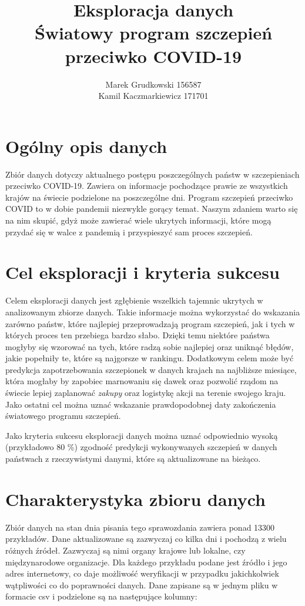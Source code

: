 \documentclass[12pt, oneside]{article}
\title{
	Eksploracja danych \\
	Światowy program szczepień przeciwko COVID-19
}
\author{
	Marek Grudkowski 156587
	\\
	Kamil Kaczmarkiewicz 171701
}
\begin{document}
\maketitle

\section{Ogólny opis danych}

Zbiór danych dotyczy aktualnego postępu poszczególnych państw w szczepieniach przeciwko COVID-19. Zawiera on informacje pochodzące prawie ze wszystkich krajów na świecie podzielone na poszczególne dni. Program szczepień przeciwko COVID to w dobie pandemii niezwykle gorący temat. Naszym zdaniem warto się na nim skupić, gdyż może zawierać wiele ukrytych informacji, które mogą przydać się w walce z pandemią i przyspieszyć sam proces szczepień. 

\section{Cel eksploracji i kryteria sukcesu}

Celem eksploracji danych jest zgłębienie wszelkich tajemnic ukrytych w analizowanym zbiorze danych. Takie informacje można wykorzystać do wskazania zarówno państw, które najlepiej przeprowadzają program szczepień, jak i tych w których proces ten przebiega bardzo słabo. Dzięki temu niektóre państwa mogłyby się wzorować na tych, które radzą sobie najlepiej oraz uniknąć błędów, jakie popełniły te, które są najgorsze w rankingu. Dodatkowym celem może być predykcja zapotrzebowania szczepionek w danych krajach na najbliższe miesiące, która mogłaby by zapobiec marnowaniu się dawek oraz pozwolić rządom na świecie lepiej zaplanować \textit{zakupy} oraz logistykę akcji na terenie swojego kraju.  Jako ostatni cel można uznać wskazanie prawdopodobnej daty zakończenia światowego programu szczepień. 
\par
Jako kryteria sukcesu eksploracji danych można uznać odpowiednio wysoką (przykładowo $80$ \%) zgodność predykcji wykonywanych szczepień w danych państwach z rzeczywistymi danymi, które są aktualizowane na bieżąco. 

\newpage

\section{Charakterystyka zbioru danych}
Zbiór danych na stan dnia pisania tego sprawozdania zawiera ponad 13300 przykładów. Dane aktualizowane są zazwyczaj co kilka dni i pochodzą z wielu różnych źródeł. Zazwyczaj są nimi organy krajowe lub lokalne, czy międzynarodowe organizacje. Dla każdego przykładu podane jest źródło i jego adres internetowy, co daje możliwość weryfikacji w przypadku jakichkolwiek wątpliwości co do poprawności danych. Dane zapisane są w jednym pliku w formacie csv i podzielone są na następujące kolumny:
\end{document}
